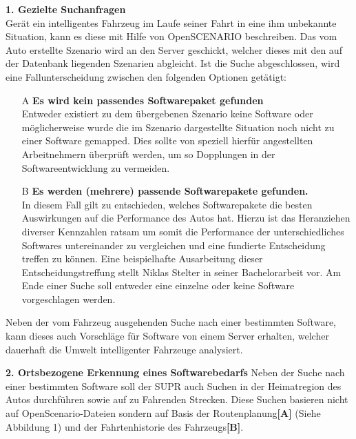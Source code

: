 \textbf{1. Gezielte Suchanfragen}\\
Gerät ein intelligentes Fahrzeug im Laufe seiner Fahrt in eine ihm unbekannte Situation, kann es diese mit Hilfe von OpenSCENARIO beschreiben. Das vom Auto erstellte Szenario wird an den Server geschickt, welcher dieses mit den auf der Datenbank liegenden Szenarien abgleicht. Ist die Suche abgeschlossen, wird eine Fallunterscheidung zwischen den folgenden Optionen getätigt:
\begin{itemize}
	\item[A] \textbf{Es wird \textbf{kein} passendes Softwarepaket gefunden}\\
	Entweder existiert zu dem übergebenen Szenario keine Software oder möglicherweise wurde die im Szenario dargestellte Situation noch nicht zu einer Software gemapped. Dies sollte von speziell hierfür angestellten Arbeitnehmern überprüft werden, um so Dopplungen in der Softwareentwicklung zu vermeiden. 
	\item[B] \textbf{Es werden (mehrere) passende Softwarepakete gefunden.}\\
	In diesem Fall gilt zu entschieden, welches Softwarepakete die besten Auswirkungen auf die Performance des Autos hat. 
	Hierzu ist das Heranziehen diverser Kennzahlen ratsam um somit die Performance der unterschiedliches Softwares untereinander zu vergleichen und eine fundierte Entscheidung treffen zu können. Eine beispielhafte Ausarbeitung dieser Entscheidungstreffung stellt Niklas Stelter in seiner Bachelorarbeit vor\cite{stelter}. Am Ende einer Suche soll entweder eine einzelne oder keine Software vorgeschlagen werden.
\end{itemize}
Neben der vom Fahrzeug ausgehenden Suche nach einer bestimmten Software, kann dieses auch Vorschläge für Software von einem Server erhalten, welcher dauerhaft die Umwelt intelligenter Fahrzeuge analysiert.

\textbf{2. Ortsbezogene Erkennung eines Softwarebedarfs}
Neben der Suche nach einer bestimmten Software soll der SUPR auch Suchen in der Heimatregion des Autos durchführen sowie auf zu Fahrenden Strecken. Diese Suchen basieren nicht auf OpenScenario-Dateien sondern auf Basis der Routenplanung\textbf{[A]} (Siehe Abbildung 1) und der Fahrtenhistorie des Fahrzeugs\textbf{[B]}.\\

